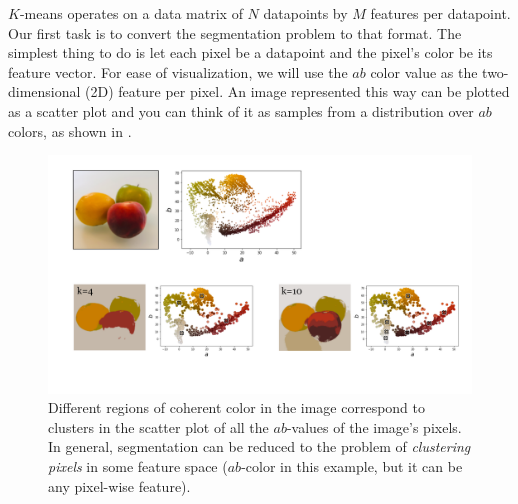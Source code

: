 $K$-means operates on a data matrix of $N$ datapoints by $M$ features per datapoint. Our first task is to convert the segmentation problem to that format. The simplest thing to do is let each pixel be a datapoint and the pixel's color be its feature vector. For ease of visualization, we will use the $ab$ color value as the two-dimensional (2D) feature per pixel. An image represented this way can be plotted as a scatter plot and you can think of it as samples from a distribution over $ab$ colors, as shown in \fig{\ref{fig:perceptual_organization:scatter_ab_fruits2}}.
\vspace{-0.4cm}
\begin{figure}[h!]
    \centerline{
        \includegraphics[width=0.75\linewidth]{./figures/perceptual_organization/scatter_ab_fruits2.pdf}
    }
    \caption{Different regions of coherent color in the image correspond to clusters in the scatter plot of all the $ab$-values of the image's pixels. In general, segmentation can be reduced to the problem of \textit{clustering pixels} in some feature space ($ab$-color in this example, but it can be any pixel-wise feature).}
    \label{fig:perceptual_organization:scatter_ab_fruits2}
\end{figure}
\vspace{-0.4cm}


